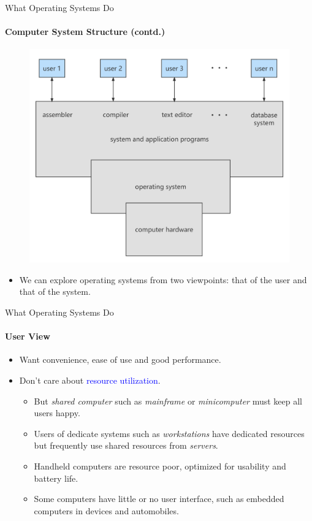 \documentclass[10pt]{beamer}
\begin{document}
\begin{frame}{What Operating Systems Do}
\framesubtitle{Computer System Structure (contd.)}
\begin{figure}
\includegraphics[width=.6\linewidth]{resources/1-7computer_system_structure.jpg} 
\end{figure}
\begin{itemize}
\item We can explore operating systems from two viewpoints: that of the \alert{user} and that of the \alert{system}.
\end{itemize}
\end{frame}

\begin{frame}{What Operating Systems Do}
\framesubtitle{User View}
\begin{itemize}
\item Want \alert{convenience}, \alert{ease of use} and \alert{good performance}. 
\item Don't care about \textcolor{blue}{resource utilization}.
\begin{itemize}
\item But \emph{shared computer} such as \emph{mainframe} or \emph{minicomputer} must keep all users happy.
\item Users of dedicate systems such as \emph{workstations} have dedicated resources but frequently use shared resources from \emph{servers}.
\item Handheld computers are resource poor, optimized for usability and battery life.
\item Some computers have little or no user interface, such as embedded computers in devices and automobiles.
\end{itemize}
\end{itemize}
\end{frame}
\end{document}
